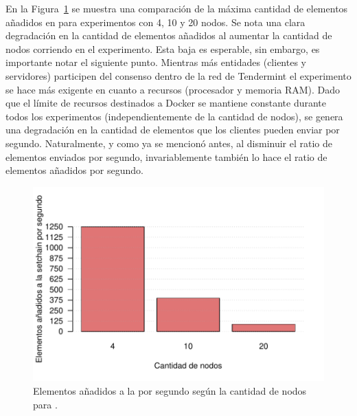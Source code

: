 En la Figura~\ref{fig:vanilla_results} se muestra una comparación de la máxima cantidad de elementos añadidos en \vanilla para experimentos con
4, 10 y 20 nodos.
Se nota una clara degradación en la cantidad de elementos añadidos al aumentar la cantidad de nodos corriendo en el experimento.
Esta baja es esperable, sin embargo, es importante notar el siguiente punto.
Mientras más entidades (clientes y servidores) participen del consenso dentro de la red de Tendermint el experimento se hace más exigente en cuanto a recursos
(procesador y memoria RAM).
Dado que el límite de recursos destinados a Docker se mantiene constante durante todos los experimentos (independientemente de la cantidad de nodos),
se genera una degradación en la cantidad de elementos que los clientes pueden enviar por segundo.
Naturalmente, y como ya se mencionó antes, al disminuir el ratio de elementos enviados por segundo, invariablemente también lo hace el ratio de
elementos añadidos por segundo.

\begin{figure}
	\centering
	\includegraphics[scale=0.7]{figures/vanilla_resultados.pdf}
	\caption{Elementos añadidos a la \setchain por segundo según la cantidad de nodos para \vanilla.}
	\label{fig:vanilla_results}
\end{figure}



